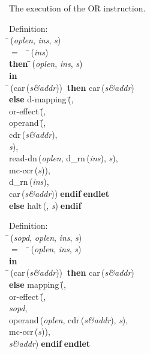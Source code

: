  The execution of the OR instruction.
\begin{tabbing}{\sc Definition}: \\  
\=\,({\it{oplen\/}}, {\it{ins\/}}, {\it{s\/}}) \\ 
$=$$\;\;\;\;$\=\,({\it{ins\/}}) \\ 
{\bf then }\=\=\,({\it{oplen\/}}, {\it{ins\/}}, {\it{s\/}})\- \\ 
{\bf in} \\ 
\=\,({\rm{car}}\,({\it{s\&addr\/}}))$\;\;${\bf then }{\rm{car}}\,({\it{s\&addr\/}}) \\ 
{\bf else }{\rm{d-mapping}}\,(\=, \\ 
{\rm{or-effect}}\,(\=, \\ 
{\rm{operand}}\,(\=, \\ 
{\rm{cdr}}\,({\it{s\&addr\/}}), \\ 
{\it{s\/}})\-, \\ 
{\rm{read-dn}}\,({\it{oplen\/}}, {\rm{d\_rn}}\,({\it{ins\/}}), {\it{s\/}}), \\ 
{\rm{mc-ccr}}\,({\it{s\/}}))\-, \\ 
{\rm{d\_rn}}\,({\it{ins\/}}), \\ 
{\rm{car}}\,({\it{s\&addr\/}}))\-$\;${\bf  endif}\-$\;${\bf  endlet}\- \\ 
{\bf else }{\rm{halt}}\,({}, {\it{s\/}})$\;${\bf  endif}\-\-
\end{tabbing}

\begin{tabbing}{\sc Definition}: \\  
\=\,({\it{sopd\/}}, {\it{oplen\/}}, {\it{ins\/}}, {\it{s\/}}) \\ 
$=$$\;\;\;\;$\=\=\,({\it{oplen\/}}, {\it{ins\/}}, {\it{s\/}})\- \\ 
{\bf in} \\ 
\=\,({\rm{car}}\,({\it{s\&addr\/}}))$\;\;${\bf then }{\rm{car}}\,({\it{s\&addr\/}}) \\ 
{\bf else }{\rm{mapping}}\,(\=, \\ 
{\rm{or-effect}}\,(\=, \\ 
{\it{sopd\/}}, \\ 
{\rm{operand}}\,({\it{oplen\/}}, {\rm{cdr}}\,({\it{s\&addr\/}}), {\it{s\/}}), \\ 
{\rm{mc-ccr}}\,({\it{s\/}}))\-, \\ 
{\it{s\&addr\/}})\-$\;${\bf  endif}\-$\;${\bf  endlet}\-\-
\end{tabbing}

